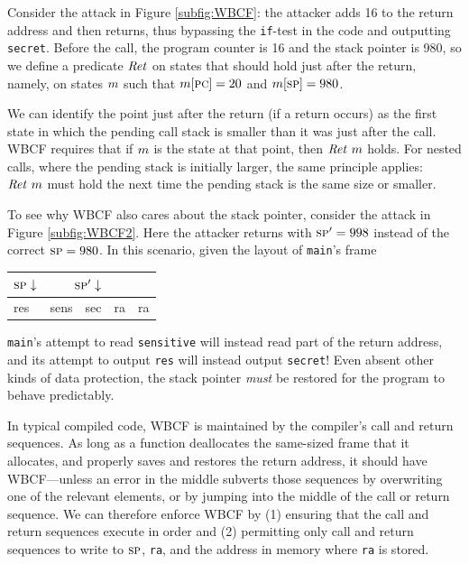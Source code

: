\documentclass[10pt,conference]{ieeetran}%
\theoremstyle{definition}
\begin{document}
Consider the attack in Figure \ref{subfig:WBCF}: the attacker adds
16 to the return address and then returns, thus bypassing the {\tt if}-test in the code and outputting
{\tt secret}. Before the call, the program counter is 16 and the stack pointer is 980,
so we define a predicate \(\mathit{Ret}\)
on states that should hold just after the return, namely, on states \(m\)
such that \(m[\textsc{pc}] = 20\) and \(m[\textsc{sp}] = 980\).

We can identify the point just after the return (if a return occurs)
as the first state in which the pending call stack is smaller than it was
just after the call.
WBCF requires that if \(m\) is the state at that point, then \(\mathit{Ret} ~ m\) holds.
For nested calls, where the pending stack is initially larger, the same principle
applies: \(\mathit{Ret} ~ m\) must hold the next time the pending stack is the same size or smaller.

To see why WBCF also cares about the stack pointer, consider the attack in
Figure \ref{subfig:WBCF2}. Here the attacker returns with \(\textsc{sp}' = 998\) instead of the
correct \(\textsc{sp} = 980\). In this scenario, given the layout of {\tt main}'s frame 
\begin{tabular}{| l | l | l | l | l |}
  \multicolumn{1}{r}{\(\textsc{sp} \downarrow\)} &
  \multicolumn{2}{r}{\(\textsc{sp}' \downarrow\)} \\
  \hline
  res & sens & sec & ra & ra \\
  \hline
\end{tabular}

\vspace{\abovedisplayskip}

\noindent
{\tt main}'s attempt to read {\tt sensitive} will instead 
read part of the return address, and its attempt to output
{\tt res} will instead output {\tt secret}! Even absent other
kinds of data protection, the stack pointer {\it must} be restored
for the program to behave predictably.

In typical compiled code, WBCF is maintained by the compiler's call and return sequences.
As long as a function deallocates the same-sized frame that it allocates, and properly
saves and restores the return address, it should have WBCF---unless an error in the middle
subverts those sequences by overwriting one of the relevant elements, or by jumping into
the middle of the call or return sequence. We can therefore enforce WBCF by (1) ensuring that
the call and return sequences execute in order and (2) permitting only call and return
sequences to write to \(\textsc{sp}\), {\tt ra}, and the address in memory where {\tt ra} is stored.
\end{document}
